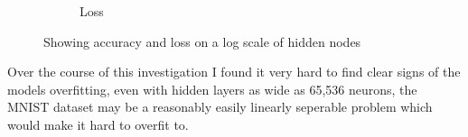 \documentclass[sigconf]{acmart}
\begin{document}
\begin{figure}
\begin{subfigure}{.25\textwidth}
      \caption{Loss}
      \label{fig:losslog}
    \end{subfigure}
    \caption{Showing accuracy and loss on a log scale of hidden nodes}
    \label{fig:log}
\end{figure}

Over the course of this investigation I found it very hard to find clear signs of the models overfitting, even with hidden layers as wide as 65,536 neurons, 
the MNIST dataset may be a reasonably easily linearly seperable problem which would make it hard to overfit to.
\end{document}
